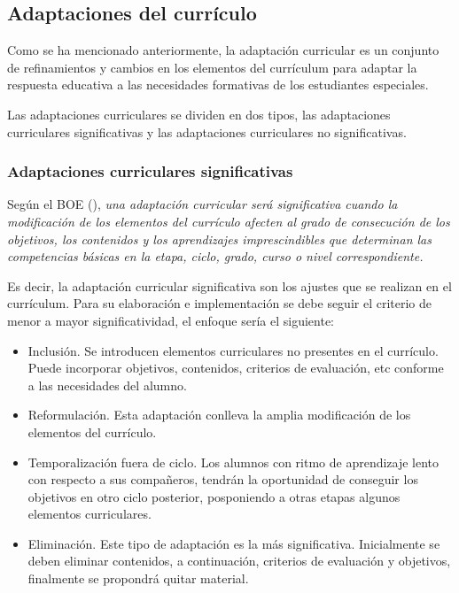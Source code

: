 \subsection{Adaptaciones del currículo}

Como se ha mencionado anteriormente, la adaptación curricular es un conjunto de refinamientos y cambios en los elementos del currículum para adaptar la respuesta educativa a las necesidades formativas de los estudiantes especiales.

Las adaptaciones curriculares se dividen en dos tipos, las adaptaciones curriculares significativas y las adaptaciones curriculares no significativas.
\subsubsection{Adaptaciones curriculares significativas}
Según el BOE (\citeyear{BOE}), \textit{una adaptación curricular será significativa cuando la modificación de los elementos del currículo afecten al grado de consecución de los objetivos, los contenidos y los aprendizajes imprescindibles que determinan las competencias básicas en la etapa, ciclo, grado, curso o nivel correspondiente. }

Es decir, la adaptación curricular significativa son los ajustes que se realizan en el currículum. Para su elaboración e implementación se debe seguir el criterio de menor a mayor significatividad, el enfoque sería el siguiente:
\begin{itemize}
    \item Inclusión. Se introducen elementos curriculares no presentes en el currículo. Puede incorporar objetivos, contenidos, criterios de evaluación, etc conforme a las necesidades del alumno.
    \item Reformulación. Esta adaptación conlleva la amplia modificación de los elementos del currículo.
    \item Temporalización fuera de ciclo. Los alumnos con ritmo de aprendizaje lento con respecto a sus compañeros, tendrán la oportunidad de conseguir los objetivos en otro ciclo posterior, posponiendo a otras etapas algunos elementos curriculares.
    \item Eliminación. Este tipo de adaptación es la más significativa. Inicialmente se deben eliminar contenidos, a continuación, criterios de evaluación y objetivos, finalmente se propondrá quitar material.
\end{itemize}


